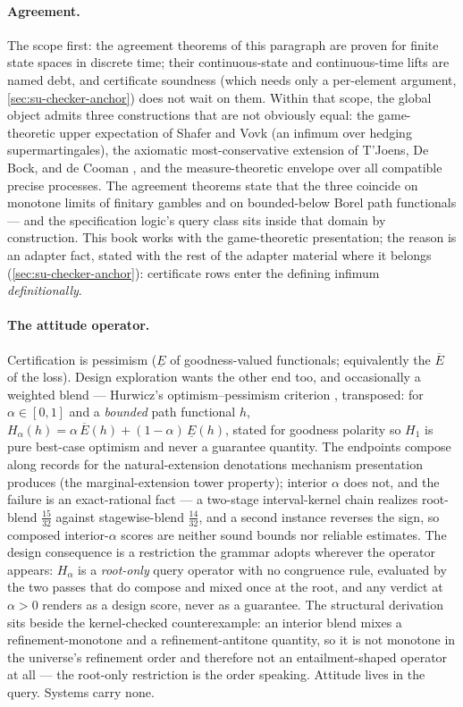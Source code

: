 \paragraph{Agreement.} The scope first: the
agreement theorems of this paragraph are proven for finite state
spaces in discrete time; their continuous-state and continuous-time
lifts are named debt, and certificate soundness (which needs only a
per-element argument, \autoref{sec:su-checker-anchor}) does not
wait on them. Within that
scope, the global object admits three constructions that are not
obviously equal: the game-theoretic upper expectation of Shafer and
Vovk \cite{shafervovk19} (an infimum over hedging supermartingales),
the axiomatic
most-conservative extension of T'Joens, De Bock, and de Cooman
\cite{tjoens20}, and the measure-theoretic envelope over all
compatible precise processes. The agreement theorems state that the
three coincide on monotone limits of finitary gambles and on
bounded-below Borel path functionals --- and the specification
logic's query class sits inside that domain by construction. This
book works with the game-theoretic presentation; the reason is an
adapter fact, stated with the rest of the adapter material where it
belongs (\autoref{sec:su-checker-anchor}): certificate rows
enter the defining infimum \emph{definitionally}.

\paragraph{The attitude operator.} Certification is pessimism
($\underline{E}$ of goodness-valued functionals; equivalently the
$\overline{E}$ of the loss). Design exploration wants the other end
too, and occasionally a weighted blend --- Hurwicz's
optimism--pessimism criterion \cite{hurwicz51}, transposed: for $\alpha \in [0,1]$
and a \emph{bounded} path functional $h$,
$H_\alpha(h) = \alpha\, \overline{E}(h) + (1-\alpha)\,
\underline{E}(h)$, stated for goodness polarity so $H_1$ is pure
best-case optimism and never a guarantee quantity. The endpoints
compose along records for the natural-extension denotations
mechanism presentation produces (the marginal-extension tower
property); interior $\alpha$ does not, and the failure is an
exact-rational fact --- a two-stage interval-kernel chain realizes
root-blend $\tfrac{15}{32}$ against stagewise-blend
$\tfrac{14}{32}$, and a second instance reverses the sign, so
composed interior-$\alpha$ scores are neither sound bounds nor
reliable estimates. The design consequence is a restriction the
grammar adopts wherever the operator appears: $H_\alpha$ is a
\emph{root-only} query operator with no congruence rule, evaluated
by the two passes that do compose and mixed once at the root, and
any verdict at $\alpha > 0$ renders as a design score, never as a
guarantee. The structural derivation sits beside the
kernel-checked counterexample: an interior blend mixes a
refinement-monotone and a refinement-antitone quantity, so it is
not monotone in the universe's refinement order and therefore not
an entailment-shaped operator at all --- the root-only restriction
is the order speaking.
Attitude lives in the query. Systems carry none.

